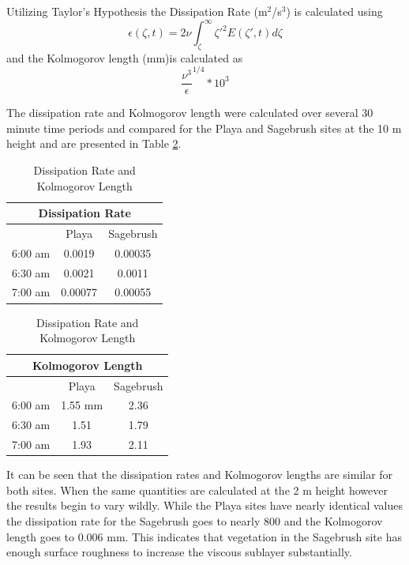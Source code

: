\documentclass[]{article}
\begin{document}
Utilizing Taylor's Hypothesis the Dissipation Rate (m$^2$/s$^3$) is calculated using 
\begin{equation} \label{eq:diss}
\epsilon (\zeta ,t) = 2\nu \int_{\zeta}^{\infty} \zeta '^2E(\zeta ',t)d\zeta 
\end{equation}
and the Kolmogorov length (mm)is calculated as 
\begin{equation} \label{eq:kolm_length}
\frac{\nu^3}{\epsilon}^{1/4}*10^3
\end{equation}

The dissipation rate and Kolmogorov length were calculated over several 30 minute time periods and compared for the Playa and Sagebrush sites at the 10 m height and are presented in Table \ref{tab:diss}. 
\begin{table}[h] 
\begin{minipage}{0.45\linewidth}
\centering
\begin{tabular}{|c||c|c|}
	\hline
	\multicolumn{3}{|c|}{Dissipation Rate} \\
	\hline
	& Playa & Sagebrush \\
	\hline
	6:00 am & 0.0019 & 0.00035 \\
	6:30 am & 0.0021 & 0.0011 \\
	7:00 am & 0.00077 & 0.00055 \\
	\hline
\end{tabular}

\end{minipage}%
\begin{minipage}{0.45\linewidth}
\centering
\begin{tabular}{|c||c|c|}
	\hline
	\multicolumn{3}{|c|}{Kolmogorov Length} \\
	\hline
	& Playa & Sagebrush \\
	\hline
	6:00 am & 1.55 mm & 2.36 \\
	6:30 am & 1.51 & 1.79 \\
	7:00 am & 1.93 & 2.11 \\
	\hline
\end{tabular}
\end{minipage}%
\caption{Dissipation Rate and Kolmogorov Length}
\label{tab:diss}
\end{table}
It can be seen that the dissipation rates and Kolmogorov lengths are similar for both sites. When the same quantities are calculated at the 2 m height however the results begin to vary wildly. While the Playa sites have nearly identical values the dissipation rate for the Sagebrush goes to nearly 800 and the Kolmogorov length goes to 0.006 mm. This indicates that vegetation in the Sagebrush site has enough surface roughness to increase the viscous sublayer substantially. 
\end{document}
